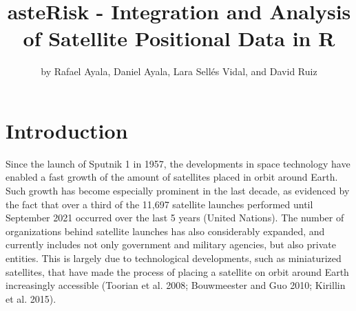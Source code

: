 \title{asteRisk - Integration and Analysis of Satellite Positional Data in R}
\author{by Rafael Ayala, Daniel Ayala, Lara Sellés Vidal, and David Ruiz}

\maketitle


\hypertarget{introduction}{%
\section{Introduction}\label{introduction}}

Since the launch of Sputnik 1 in 1957, the developments in space technology have enabled a fast growth of the amount of satellites placed in orbit around Earth. Such growth has become especially prominent in the last decade, as evidenced by the fact that over a third of the 11,697 satellite launches performed until September 2021 occurred over the last 5 years (United Nations). The number of organizations behind satellite launches has also considerably expanded, and currently includes not only government and military agencies, but also private entities. This is largely due to technological developments, such as miniaturized satellites, that have made the process of placing a satellite on orbit around Earth increasingly accessible (Toorian et al. 2008; Bouwmeester and Guo 2010; Kirillin et al. 2015).

